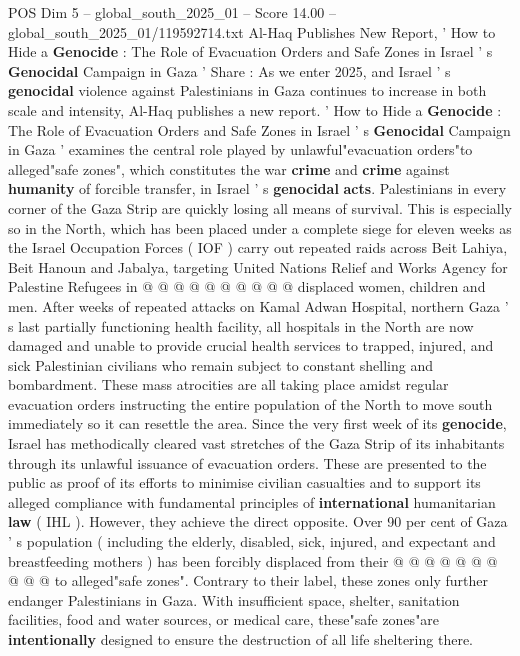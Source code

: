 \begin{textsample}{POS Dim 5 – global\_south\_2025\_01 – Score 14.00 – global\_south\_2025\_01/119592714.txt}  \label{ex:f5_pos_357}
Al-Haq Publishes New Report, ' How to Hide a \textbf{Genocide} : The Role of Evacuation Orders and Safe Zones in Israel ' s \textbf{Genocidal} Campaign in Gaza ' Share : As we enter 2025, and Israel ' s \textbf{genocidal} violence against Palestinians in Gaza continues to increase in both scale and intensity, Al-Haq publishes a new report. ' How to Hide a \textbf{Genocide} : The Role of Evacuation Orders and Safe Zones in Israel ' s \textbf{Genocidal} Campaign in Gaza ' examines the central role played by unlawful"evacuation orders"to alleged"safe zones", which constitutes the war \textbf{crime} and \textbf{crime} against \textbf{humanity} of forcible transfer, in Israel ' s \textbf{genocidal} \textbf{acts}.
Palestinians in every corner of the Gaza Strip are quickly losing all means of survival.
This is especially so in the North, which has been placed under a complete siege for eleven weeks as the Israel Occupation Forces ( IOF ) carry out repeated raids across Beit Lahiya, Beit Hanoun and Jabalya, targeting United Nations Relief and Works Agency for Palestine Refugees in @ @ @ @ @ @ @ @ @ @ displaced women, children and men.
After weeks of repeated attacks on Kamal Adwan Hospital, northern Gaza ' s last partially functioning health facility, all hospitals in the North are now damaged and unable to provide crucial health services to trapped, injured, and sick Palestinian civilians who remain subject to constant shelling and bombardment.
These mass atrocities are all taking place amidst regular evacuation orders instructing the entire population of the North to move south immediately so it can resettle the area.
Since the very first week of its \textbf{genocide}, Israel has methodically cleared vast stretches of the Gaza Strip of its inhabitants through its unlawful issuance of evacuation orders.
These are presented to the public as proof of its efforts to minimise civilian casualties and to support its alleged compliance with fundamental principles of \textbf{international} humanitarian \textbf{law} ( IHL ).
However, they achieve the direct opposite.
Over 90 per cent of Gaza ' s population ( including the elderly, disabled, sick, injured, and expectant and breastfeeding mothers ) has been forcibly displaced from their @ @ @ @ @ @ @ @ @ @ to alleged"safe zones".
Contrary to their label, these zones only further endanger Palestinians in Gaza.
With insufficient space, shelter, sanitation facilities, food and water sources, or medical care, these"safe zones"are \textbf{intentionally} designed to ensure the destruction of all life sheltering there.

\end{textsample}
